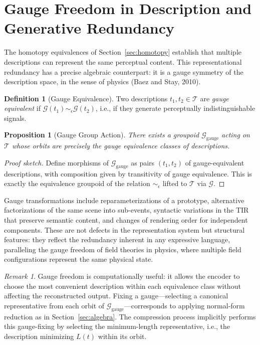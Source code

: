 \documentclass[11pt,a4paper]{article}
\newtheorem{proposition}[theorem]{Proposition}
\theoremstyle{definition}
\newtheorem{definition}[theorem]{Definition}
\theoremstyle{remark}
\newtheorem{remark}[theorem]{Remark}
\begin{document}
\section{Gauge Freedom in Description and Generative Redundancy}
\label{sec:gauge}

The homotopy equivalences of Section~\ref{sec:homotopy} establish that multiple descriptions can represent the same perceptual content. This representational redundancy has a precise algebraic counterpart: it is a gauge symmetry of the description space, in the sense of physics (Baez and Stay, 2010).

\begin{definition}[Gauge Equivalence]
Two descriptions $t_1, t_2 \in \mathcal{T}$ are \emph{gauge equivalent} if $\mathcal{G}(t_1) \sim_\epsilon \mathcal{G}(t_2)$, i.e., if they generate perceptually indistinguishable signals.
\end{definition}

\begin{proposition}[Gauge Group Action]
There exists a groupoid $\mathcal{G}_{\mathrm{gauge}}$ acting on $\mathcal{T}$ whose orbits are precisely the gauge equivalence classes of descriptions.
\end{proposition}

\begin{proof}[Proof sketch]
Define morphisms of $\mathcal{G}_{\mathrm{gauge}}$ as pairs $(t_1, t_2)$ of gauge-equivalent descriptions, with composition given by transitivity of gauge equivalence. This is exactly the equivalence groupoid of the relation $\sim_\epsilon$ lifted to $\mathcal{T}$ via $\mathcal{G}$.
\end{proof}

Gauge transformations include reparameterizations of a prototype, alternative factorizations of the same scene into sub-events, syntactic variations in the TIR that preserve semantic content, and changes of rendering order for independent components. These are not defects in the representation system but structural features: they reflect the redundancy inherent in any expressive language, paralleling the gauge freedom of field theories in physics, where multiple field configurations represent the same physical state.

\begin{remark}
Gauge freedom is computationally useful: it allows the encoder to choose the most convenient description within each equivalence class without affecting the reconstructed output. Fixing a gauge---selecting a canonical representative from each orbit of $\mathcal{G}_{\mathrm{gauge}}$---corresponds to applying normal-form reduction as in Section~\ref{sec:algebra}. The compression process implicitly performs this gauge-fixing by selecting the minimum-length representative, i.e., the description minimizing $L(t)$ within its orbit.
\end{remark}
\end{document}
